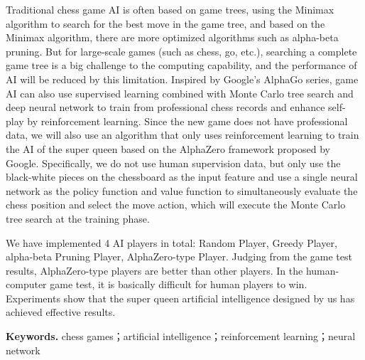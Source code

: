 Traditional chess game AI is often based on game trees, using the Minimax algorithm to search for the best move in the game tree, and based on the Minimax algorithm, there are more optimized algorithms such as alpha-beta pruning. But for large-scale games (such as chess, go, etc.), searching a complete game tree is a big challenge to the computing capability, and the performance of AI will be reduced by this limitation. 
Inspired by Google's AlphaGo series, game AI can also use supervised learning combined with Monte Carlo tree search and deep neural network to train from professional chess records and enhance self-play by reinforcement learning.
Since the new game does not have professional data, we will also use an algorithm that only uses reinforcement learning to train the AI of the super queen based on the AlphaZero framework proposed by Google. Specifically, we do not use human supervision data, but only use the black-white pieces on the chessboard as the input feature and use a single neural network as the policy function and value function to simultaneously evaluate the chess position and select the move action, which will execute the Monte Carlo tree search at the training phase.


We have implemented 4 AI players in total: Random Player, Greedy Player, alpha-beta Pruning Player, AlphaZero-type Player. Judging from the game test results, AlphaZero-type players are better than other players. In the human-computer game test, it is basically difficult for human players to win. Experiments show that the super queen artificial intelligence designed by us has achieved effective results.

\noindent\textbf{Keywords.} chess games；artificial intelligence；reinforcement learning；neural network